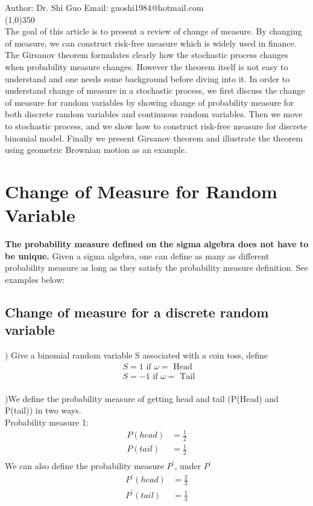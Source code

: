\documentclass[a4paper]{article}
\begin{document}
Author: Dr. Shi Guo  \hspace{30mm} Email: guoshi1984@hotmail.com\\
\line(1,0){350}\\

The goal of this article is to present a review of change of measure. By changing of measure, we can construct risk-free measure which is widely used in finance. The Girsanov theorem formulates clearly how the stochastic process changes when probability measure changes. However the theorem itself
is not easy to understand and one needs some background before diving into it. In order to understand change of measure in a stochastic process, we first discuss the change of measure for random variables by showing change of probability measure for both discrete random variables and continuous random variables. Then we move to stochastic process, and we show how to construct risk-free measure for discrete binomial model. Finally we present Girsanov theorem and illustrate the theorem using geometric Brownian motion as an example.

\section{Change of Measure for Random Variable }

{\bf The probability measure defined on the sigma algebra does not have to be unique.} Given a sigma algebra, one can define as many as different probability measure as long as they satisfy the probability measure definition. See examples below:
\subsection{Change of measure for a discrete random variable}
) Give a binomial random variable S associated with a coin toss, define 
\begin{align*}
&S = 1  \textrm{ if } \omega = \textrm{ Head } \\
&S = -1 \textrm{ if } \omega = \textrm{ Tail } \\
\end{align*}

)We define the probability measure of getting head and tail (P(Head) and P(tail)) in two ways. \\
Probability measure 1:\\
\begin{align*}
P(head) & = \frac{1}{2}\\ 
P(tail) & = \frac{1}{2}\\
\end{align*}
We can also define the probability measure $P^{'}$, under $P^{'}$\\ 
\begin{align*}
P^{'}(head) & = \frac{2}{3}\\ 
P^{'}(tail) & = \frac{1}{3}\\
\end{align*}
 
\end{document}
